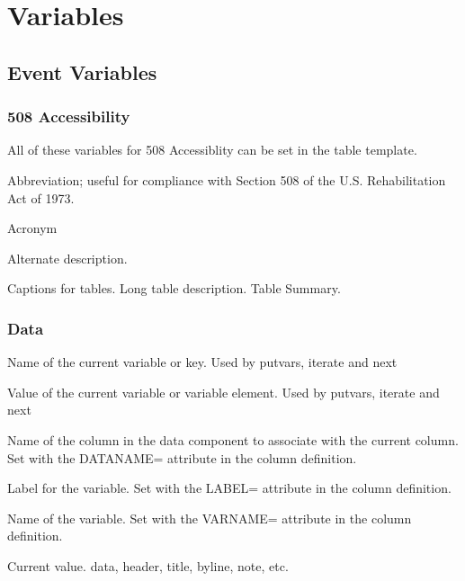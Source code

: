 \chapter{Variables}
\section{Event Variables}
\subsection{508 Accessibility}

All of these variables for 508 Accessiblity can be set in the table template.

\begin{description}
 Abbreviation; useful for compliance with Section 508 of the U.S. Rehabilitation Act of 1973.

Acronym

Alternate description.

	Captions for tables.
	Long table description.
        Table Summary.

\end{description}

\subsection{Data}

\begin{description}
    Name of the current variable or key. Used by putvars, iterate and next

    Value of the current variable or variable element. Used by putvars, iterate and next

    Name of the column in the data component to associate with the current column. Set with the DATANAME= attribute in the column definition.

    Label for the variable. Set with the LABEL= attribute in the column definition.

    Name of the variable. Set with the VARNAME= attribute in the column definition.

    Current value. data, header, title, byline, note, etc.

\end{description}

